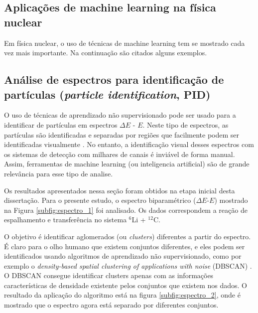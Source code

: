 \documentclass[a4paper,12pt,oneside]{book}
\begin{document}

\begin{appendices}


\chapter{Aplicações de machine learning na física nuclear} \label{appendix:ml_nuclear}

\par Em física nuclear, o uso de técnicas de machine learning tem se mostrado cada vez mais importante. Na continuação são citados alguns exemplos.

\section{Análise de espectros para identificação de partículas (\textit{particle identification}, PID)}

\par O uso de técnicas de aprendizado não supervisionado pode ser usado para a identificar de partículas em espectros $\Delta E$ - $E$. Neste tipo de espectros, as partículas são identificadas e separadas por regiões que facilmente podem ser identificadas visualmente \cite{DETC_TELE}. No entanto, a identificação visual desses espectros com os sistemas de detecção com milhares de canais é inviável de forma manual. Assim, ferramentas de machine learning (ou inteligencia artificial) são de grande relevância para esse tipo de analise.

Os resultados apresentados nessa seção foram obtidos na etapa inicial desta dissertação. Para o presente estudo, o espectro biparamétrico ($\Delta E$-$E$) mostrado na Figura \ref{subfig:espectro_1} foi analisado. Os dados correspondem a reação de espalhamento e transferência no sistema $^{6}$Li + $^{12}$C.



\par O objetivo é identificar aglomerados (ou \textit{clusters}) diferentes a partir do espectro. É claro para o olho humano que existem conjuntos diferentes, e eles podem ser identificados usando algoritmos de aprendizado não supervisionado, como por exemplo o \textit{density-based spatial clustering of applications with noise} (DBSCAN) \cite{dbscan}. O DBSCAN consegue identificar clusters apenas com as informações características de densidade existente pelos conjuntos que existem nos dados. O resultado da aplicação do algoritmo está na figura \ref{subfig:espectro_2}, onde é mostrado que o espectro agora está separado por diferentes conjuntos.


\end{appendices}
\end{document}

